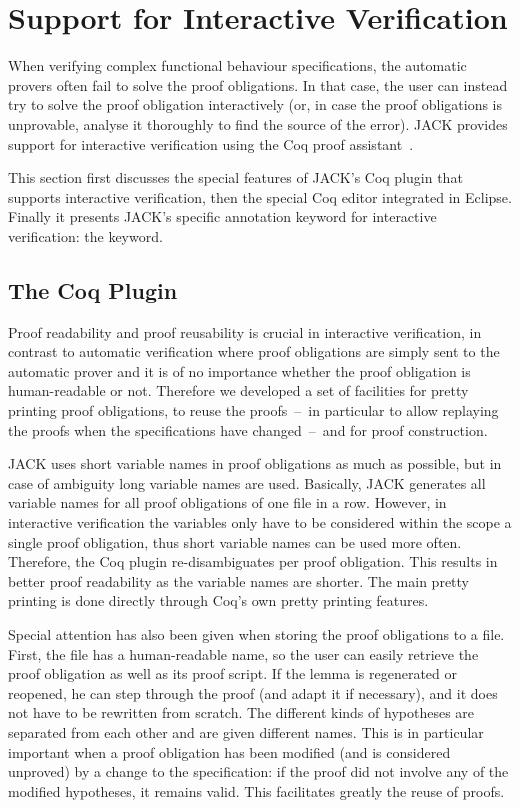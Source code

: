 

\section{Support for Interactive Verification}\label{SecInteractive}
When verifying complex functional behaviour specifications, the
automatic provers often fail to solve the proof obligations. In that
case, the user can instead try to solve the proof obligation
interactively (or, in case the proof obligations is unprovable,
analyse it thoroughly to find the source of the error). JACK provides
support for interactive verification using the Coq proof
assistant~\cite{Coq04}.

This section first discusses the special features of JACK's Coq plugin
that supports interactive verification, then the special Coq editor
integrated in Eclipse. Finally it presents JACK's specific annotation
keyword for interactive verification: the \native keyword.

\subsection{The Coq Plugin}

Proof readability and proof reusability is crucial in interactive
verification, in contrast to automatic verification where proof
obligations are simply sent to the automatic prover and it is of no
importance whether the proof obligation is human-readable or not.
Therefore we developed a set of facilities for pretty printing proof
obligations, to reuse the proofs~--~in particular to allow replaying
the proofs when the specifications have changed~--~and for proof
construction.

JACK uses short variable names in proof obligations as much as
possible, but in case of ambiguity long variable names are used.
Basically, JACK generates all variable names for all proof obligations
of one file in a row. However, in interactive verification the
variables only have to be considered within the scope a single proof
obligation, thus short variable names can be used more often.
Therefore, the Coq plugin re-disambiguates per proof obligation.  This
results in better proof readability as the variable names are shorter.
The main pretty printing is done directly through Coq's own pretty
printing features.


Special attention has also been given when storing the proof
obligations to a file. First, the file has a human-readable name, so
the user can easily retrieve the proof obligation as well as its proof
script. If the lemma is regenerated or reopened, he can step through
the proof (and adapt it if necessary), and it does not have to be
rewritten from scratch.  The different kinds of hypotheses are
separated from each other and are given different names.  This is in
particular important when a proof obligation has been modified (and is
considered unproved) by a change to the specification: if the proof
did not involve any of the modified hypotheses, it remains valid. This
facilitates greatly the reuse of proofs.

